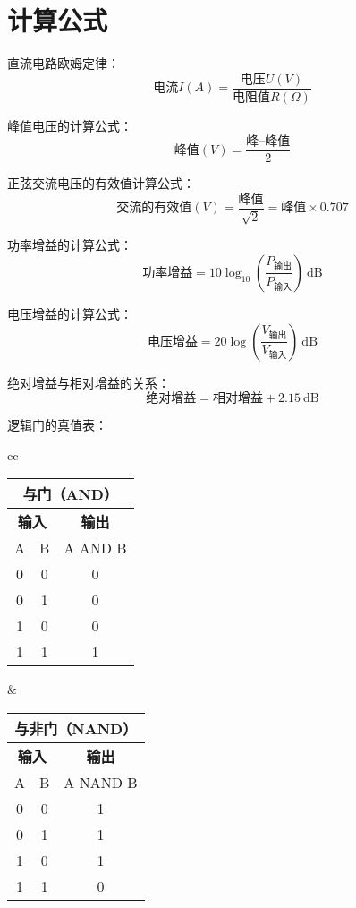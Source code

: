\newpage

\section{计算公式}

直流电路欧姆定律：
$$\mbox{电流}I(A)=\frac{\mbox{电压}U(V)}{\mbox{电阻值}R(\Omega)}$$

峰值电压的计算公式：
$$\mbox{峰值}(V)=\frac{\mbox{峰--峰值}}{2}$$

正弦交流电压的有效值计算公式：
$$\mbox{交流的有效值}(V)=\frac{\mbox{峰值}}{\sqrt{2}}=\mbox{峰值}\times0.707$$

功率增益的计算公式：
$$\mbox{功率增益}=10 \log_{10} \left( {\frac{P_{ \mbox{输出} }}{P_{ \mbox{输入} }}}\right)\ \mathrm{dB}$$

电压增益的计算公式：
$$\mbox{电压增益}=20 \log \left( {\frac{V_{ \mbox{输出} }}{V_{ \mbox{输入} }}} \right)\ \mathrm{dB}$$


绝对增益与相对增益的关系：
$$\mbox{绝对增益} = \mbox{相对增益} + 2.15 \ \mathrm{dB}$$

逻辑门的真值表：

\begin{tabular}{cc}%
\begin{tabular}{|c|c|c|}
	\multicolumn{3}{c}{\textbf{与门（AND）}} \\
	\hline
	\multicolumn{2}{|c|}{\textbf{输入}} & \textbf{输出} \\
	\hline
	A & B & A AND B \\
	\hline
	0 & 0 & 0 \\
	\hline
	0 & 1 & 0 \\
	\hline
	1 & 0 & 0 \\
	\hline
	1 & 1 & 1 \\
	\hline
\end{tabular} &
\begin{tabular}{|c|c|c|}
	\multicolumn{3}{c}{\textbf{与非门（NAND）}} \\
	\hline
	\multicolumn{2}{|c|}{\textbf{输入}} & \textbf{输出} \\
	\hline
	A & B & A NAND B \\
	\hline
	0 & 0 & 1 \\
	\hline
	0 & 1 & 1 \\
	\hline
	1 & 0 & 1 \\
	\hline
	1 & 1 & 0 \\
	\hline
\end{tabular} \tabularnewline
\end{tabular}

